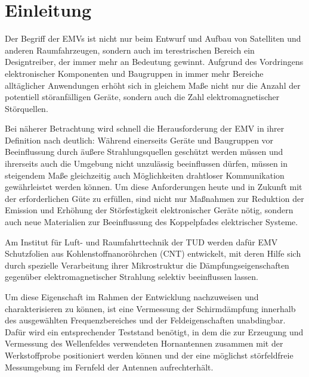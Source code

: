 

\chapter{Einleitung}\label{cha:1}

Der Begriff der \acp{EMV} ist nicht nur beim Entwurf und Aufbau von Satelliten und anderen Raumfahrzeugen, sondern auch im terestrischen Bereich ein Designtreiber, der immer mehr an Bedeutung gewinnt. Aufgrund des Vordringens elektronischer Komponenten und Baugruppen in immer mehr Bereiche alltäglicher Anwendungen erhöht sich in gleichem Maße nicht nur die Anzahl der potentiell störanfälligen Geräte, sondern auch die Zahl elektromagnetischer Störquellen. \par
\vspace{\linespace}
Bei näherer Betrachtung wird schnell die Herausforderung der \ac{EMV} in ihrer Definition nach \cite{VDE_0870} deutlich: Während einerseits Geräte und Baugruppen vor Beeinflussung durch äußere Strahlungsquellen geschützt werden müssen und ihrerseits auch die Umgebung nicht unzulässig beeinflussen dürfen, müssen in steigendem Maße gleichzeitig auch Möglichkeiten drahtloser Kommunikation gewährleistet werden können. Um diese Anforderungen heute und in Zukunft mit der erforderlichen Güte zu erfüllen, sind nicht nur Maßnahmen zur Reduktion der Emission und Erhöhung der Störfestigkeit elektronischer Geräte nötig, sondern auch neue Materialien zur Beeinflussung des Koppelpfades elektrischer Systeme.
\par
\vspace{\linespace}
Am Institut für Luft- und Raumfahrttechnik der \ac{TUD} werden dafür \ac{EMV} Schutzfolien aus Kohlenstoffnanoröhrchen (CNT)  entwickelt, mit deren Hilfe sich durch spezielle Verarbeitung ihrer Mikrostruktur die Dämpfungseigenschaften gegenüber elektromagnetischer Strahlung selektiv beeinflussen lassen. \par
\vspace{\linespace}
Um diese Eigenschaft im Rahmen der Entwicklung nachzuweisen und charakterisieren zu können, ist eine Vermessung der Schirmdämpfung innerhalb des ausgewählten Frequenzbereiches und der Feldeigenschaften unabdingbar. Dafür wird ein entsprechender Teststand benötigt, in dem die zur Erzeugung und Vermessung des Wellenfeldes verwendeten Hornantennen zusammen mit der Werkstoffprobe positioniert werden können und der eine möglichst störfeldfreie Messumgebung im Fernfeld der Antennen aufrechterhält.
\par
